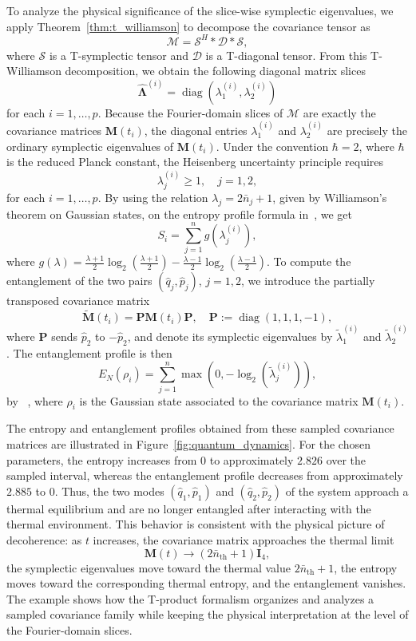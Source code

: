 \documentclass[pdflatex,sn-mathphys-ay]{sn-jnl}
\newcommand{\T}[1]{\mathcal{#1}}    %
\newcommand{\M}[1]{\bm{#1}}     %
\newcommand{\diag}{\operatorname{diag}}
\theoremstyle{thmstyleone}
\theoremstyle{thmstyletwo}
\theoremstyle{thmstylethree}
\numberwithin{equation}{section}
\begin{document}
To analyze the physical significance of the slice-wise symplectic eigenvalues, we apply Theorem~\ref{thm:t_williamson} to decompose the covariance tensor as
$$
\T{M} = \T{S}^H * \T{D} * \T{S},
$$
where $\T{S}$ is a T-symplectic tensor and $\T{D}$ is a T-diagonal tensor. From this T-Williamson decomposition, we obtain the following diagonal matrix slices
$$
\widehat{\M{\Lambda}}^{(i)} =
\diag(\lambda_1^{(i)},\lambda_2^{(i)})
$$
for each $i=1,\dots,p$. Because the Fourier-domain slices of $\T{M}$ are exactly the covariance matrices $\M{M}(t_i)$, the diagonal entries $\lambda_1^{(i)}$ and $\lambda_2^{(i)}$ are precisely the ordinary symplectic eigenvalues of $\M{M}(t_i)$.
Under the convention $\hbar=2$, where $\hbar$ is the reduced Planck constant, the Heisenberg uncertainty principle requires
$$
\lambda_j^{(i)} \ge 1,
\quad j=1,2,
$$
for each $i=1,\dots,p$. By using the relation $\lambda_j=2\bar{n}_j+1$, given by Williamson's theorem on Gaussian states, on the entropy profile formula in~\cite{serafini2004symplectic}, we get
\begin{equation*}
    S_i = \sum_{j=1}^{n} g(\lambda_j^{(i)}),
\end{equation*}
where $g(\lambda) = \frac{\lambda + 1}{2} \log_2\left(\frac{\lambda + 1}{2}\right) - \frac{\lambda - 1}{2} \log_2\left(\frac{\lambda - 1}{2}\right)$. 
To compute the entanglement of the two pairs $(\hat{q}_j,\hat{p}_j)$, $j=1,2$, we introduce the partially transposed covariance matrix
$$
\widetilde{\M{M}}(t_i) = \M{P}\M{M}(t_i)\M{P},
\quad
\M{P} := \diag(1,1,1,-1),
$$
where $\M{P}$ sends $\hat{p}_2$ to $-\hat{p}_2$, and denote its symplectic eigenvalues by $\tilde{\lambda}_1^{(i)}$ and $\tilde{\lambda}_2^{(i)}$. The entanglement profile is then
\begin{equation*}
    E_N(\rho_i) = \sum_{j=1}^{n} \max(0, -\log_2(\tilde{\lambda}_j^{(i)})),
\end{equation*}
by ~\cite{adesso2004extremal}, where $\rho_i$ is the Gaussian state associated to the covariance matrix $\M{M}(t_i)$.

The entropy and entanglement profiles
obtained from these sampled covariance matrices are illustrated in Figure~\ref{fig:quantum_dynamics}. For the chosen parameters, the entropy increases from $0$ to approximately $2.826$ over the sampled interval, whereas the  entanglement profile
decreases from approximately $2.885$ to $0$. 
Thus, the two modes $(\hat{q}_1,\hat{p}_1)$ and $(\hat{q}_2,\hat{p}_2)$ of the system approach a thermal equilibrium and are no longer entangled after interacting with the thermal environment.
This behavior is consistent with the physical picture of decoherence: as $t$ increases, the covariance matrix approaches the thermal limit
$$
\M{M}(t) \to (2\bar{n}_{\text{th}}+1)\M{I}_4,
$$
the symplectic eigenvalues move toward the thermal value $2\bar{n}_{\text{th}}+1$, the entropy moves toward the corresponding thermal entropy, and the entanglement vanishes. 
The example shows how the T-product formalism organizes and analyzes a sampled covariance family while keeping the physical interpretation at the level of the Fourier-domain slices.
\end{document}
